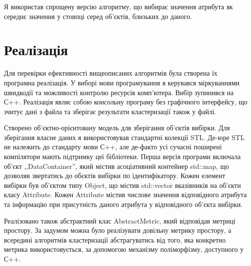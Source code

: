         Я використав спрощену версію алгоритму, що вибирає значення атрибута як середнє значення у стовпці серед об'єктів, близьких до даного.
            
    \section {Реалізація}
        Для перевірки ефективності вищеописаних алгоритмів була створена їх програмна реалізація. У виборі мови програмування я керувався міркуваннями швидкодії та можливості контролю ресурсів комп'ютера. Вибір зупинився на С++. Реалізація являє собою консольну програму без графічного інтерфейсу, що зчитує дані з файла та зберігає результати кластеризації також у файлі.
        
        Створено об'єктно-орієнтовану модель для зберігання об'єктів вибірки. Для зберігання власне даних я використовував стандартні колекції STL. Де-юре STL не належить до стандарту мови С++, але де-факто усі сучасні поширені компілятори мають підтримку цеї бібліотеки. Перша версія програми включала об'єкт ,,DataContainer'', який містив асоціативний контейнер std::map, що дозволяв звертатись до обєктів вибірки по ідентифікатору. Кожен елемент вибірки був об'єктом типу Object, що містив std::vector вказівників на об'єкти класу Attribute. Кожен Attribute містив числове значення відповідного атрибута та інформацію при присутність даного атрибута у відповідного об'єкта вибірки.
        
        Реалізовано також абстрактний клас AbstractMetric, який відповідав метриці простору. За задумом можна було реалізувати довільну метрику простору, а всередині алгоритмів кластеризації абстрагуватись від того, яка конкретно метрика використовується, за допомогою механізму поліморфізму, доступного у С++.
